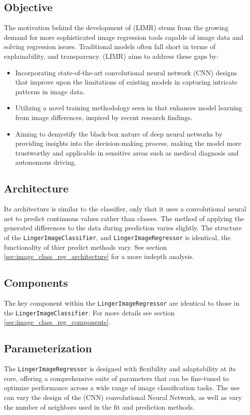\documentclass[a4paper, 12pt]{report}
\begin{document}
\subsection{Objective}
The motivation behind the development of (LIMR) stems from the growing demand for more sophisticated image regression tools capable of image data and solving regression issues. 
Traditional models often fall short in terms of explainability, and transparency. 
(LIMR) aims to address these gaps by:

\begin{itemize}
    \item Incorporating state-of-the-art convolutional neural network (CNN) designs that improve upon the limitations of existing models in capturing intricate patterns in image data.
    \item Utilizing a novel training methodology seen in \cite{learningFromDifferences2022} that enhances model learning from image differences, inspired by recent research findings.
    \item Aiming to demystify the black-box nature of deep neural networks by providing insights into the decision-making process, making the model more trustworthy and applicable in sensitive 
    areas such as medical diagnosis and autonomous driving.
\end{itemize}
\subsection{Architecture}
Its architecture is similar to the classifier, only that it uses a convolutional neural net to predict continuous values rather than classes. The method of applying the generated differences to the data during prediction varies slightly.
The structure of the \texttt{LingerImageClassifier}, and \texttt{LingerImageRegressor} is identical, the functionality of thier predict methods vary.
See section \ref{sec:image_class_reg_architecture} for a more indepth analysis.
\subsection{Components}
The key component within the \texttt{LingerImageRegressor} are identical to those in the \texttt{LingerImageClassifier}.
For more details see section \ref{sec:image_class_reg_components}.
\subsection{Parameterization}
The \texttt{LingerImageRegressor} is designed with flexibility and adaptability at its core, offering a comprehensive suite of parameters that can be fine-tuned to optimize performance across a wide range of image classification tasks. 
The use can vary the design of the (CNN) convolutional Neural Network, as well as vary the number of neighbors used in the fit and prediction methods.
\end{document}
